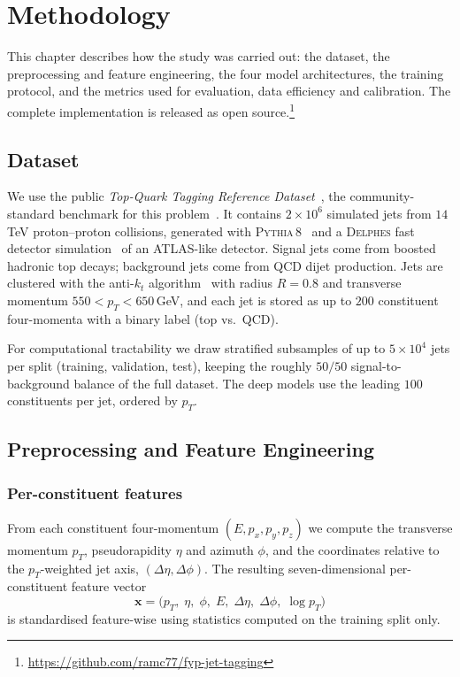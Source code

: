 \chapter{Methodology}
\label{chap:methodology}

This chapter describes how the study was carried out: the dataset, the
preprocessing and feature engineering, the four model architectures, the
training protocol, and the metrics used for evaluation, data efficiency and
calibration. The complete implementation is released as open
source.\footnote{\url{https://github.com/ramc77/fyp-jet-tagging}}

\section{Dataset}
\label{sec:dataset}

We use the public \emph{Top-Quark Tagging Reference
Dataset}~\citep{kasieczka2019dataset}, the community-standard benchmark for
this problem~\citep{kasieczka2019landscape}. It contains $2\times10^{6}$
simulated jets from $14$\,TeV proton--proton collisions, generated with
\textsc{Pythia\,8}~\citep{sjostrand2015pythia} and a \textsc{Delphes}
fast detector simulation~\citep{delphes2014} of an ATLAS-like detector.
Signal jets come from boosted hadronic top decays; background jets come from
QCD dijet production. Jets are clustered with the anti-$k_t$
algorithm~\citep{cacciari2008} with radius $R=0.8$ and transverse momentum
$550<p_T<650$\,GeV, and each jet is stored as up to $200$ constituent
four-momenta with a binary label (top vs.\ QCD).

For computational tractability we draw stratified subsamples of up to
$5\times10^{4}$ jets per split (training, validation, test), keeping the
roughly $50/50$ signal-to-background balance of the full dataset. The deep
models use the leading $100$ constituents per jet, ordered by $p_T$.

\section{Preprocessing and Feature Engineering}
\label{sec:features}

\subsection{Per-constituent features}
From each constituent four-momentum $(E,p_x,p_y,p_z)$ we compute the
transverse momentum $p_T$, pseudorapidity $\eta$ and azimuth $\phi$, and the
coordinates relative to the $p_T$-weighted jet axis,
$(\Delta\eta,\Delta\phi)$. The resulting seven-dimensional per-constituent
feature vector
\begin{equation}
\mathbf{x}=\bigl(p_T,\;\eta,\;\phi,\;E,\;\Delta\eta,\;\Delta\phi,\;\log p_T\bigr)
\end{equation}
is standardised feature-wise using statistics computed on the training split
only.

